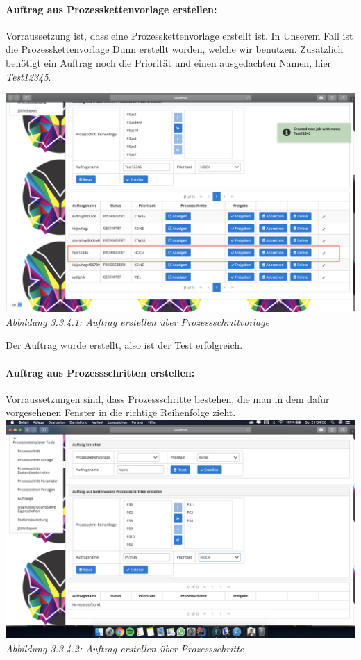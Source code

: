 \documentclass[enabledeprecatedfontcommands,fontsize=12pt,paper=a4,twoside]{scrartcl}
\begin{document}
\paragraph{Auftrag aus Prozesskettenvorlage erstellen:}

Vorraussetzung ist, dass eine Prozesskettenvorlage erstellt ist. In Unserem Fall ist die Prozesskettenvorlage Dunn erstellt worden, welche wir benutzen. Zusätzlich benötigt ein Auftrag noch die Priorität und einen ausgedachten Namen, hier \textit{Test12345}.

\hypertarget{sc3.3.4.1}{
\includegraphics[width=1\textwidth]{Screenshots/3341.png}
\textit{Abbildung 3.3.4.1: Auftrag erstellen über Prozessschrittvorlage}
} 

Der Auftrag wurde erstellt, also ist der Test erfolgreich.

%
\paragraph{Auftrag aus Prozessschritten erstellen:}

Vorraussetzungen sind, dass Prozessschritte bestehen, die man in dem dafür vorgesehenen Fenster in die richtige Reihenfolge zieht. \\

\hypertarget{sc3.3.4.2}{
\includegraphics[width=1\textwidth]{Screenshots/3342.png}
\textit{Abbildung 3.3.4.2: Auftrag erstellen über Prozessschritte}
} \\
\end{document}

